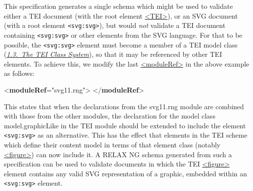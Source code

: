 This specification generates a single schema which might be used to validate either a TEI document (with the root element \hyperref[TEI.TEI]{<TEI>}), or an SVG document (with a root element \texttt{<svg:svg>}), but would \textit{not} validate a TEI document containing \texttt{<svg:svg>} or other elements from the SVG language. For that to be possible, the \texttt{<svg:svg>} element must become a member of a TEI model class (\textit{\hyperref[STEC]{1.3.\ The TEI Class System}}), so that it may be referenced by other TEI elements. To achieve this, we modify the last \hyperref[TEI.moduleRef]{<moduleRef>} in the above example as follows: \par\bgroup{}\exampleFont \begin{shaded}\noindent\mbox{}{<\textbf{moduleRef}\hspace*{1em}{url}="{svg11.rng}">}\mbox{}\newline 
{}\mbox{}\newline 
\hspace*{1em}\mbox{}\newline 
\hspace*{1em}\hspace*{1em}\mbox{}\newline 
\hspace*{1em}\mbox{}\newline 
{}\mbox{}\newline 
{</\textbf{moduleRef}>}\end{shaded}\egroup\par \par
This states that when the declarations from the \textsf{svg11.rng} module are combined with those from the other modules, the declaration for the model class \textsf{model.graphicLike} in the TEI module should be extended to include the element \texttt{<svg:svg>} as an alternative. This has the effect that elements in the TEI scheme which define their content model in terms of that element class (notably \hyperref[TEI.figure]{<figure>}) can now include it. A RELAX NG schema generated from such a specification can be used to validate documents in which the TEI \hyperref[TEI.figure]{<figure>} element contains any valid SVG representation of a graphic, embedded within an \texttt{<svg:svg>} element.
